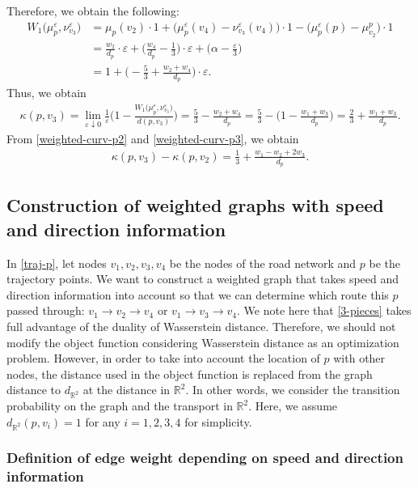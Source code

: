 \documentclass{article}
\numberwithin{equation}{section}
\theoremstyle{definition}
\newcommand{\A}{\alpha}
\newcommand{\K}{\kappa}
\newcommand{\R}{\mathbb{R}}
\newcommand{\eps}{\varepsilon} %
\newcommand{\dto}{\downarrow}
\begin{document}
Therefore, we obtain the following:
\begin{align*}
    W_1\big(\mu_p^\eps,\nu_{v_3}^\eps\big) &= 
     \mu_p(v_2)\cdot1 + \Big(\mu_p^\eps(v_4)-\nu_{v_3}^\eps(v_4)\Big)\cdot1
       -\Big(\mu_p^\eps(p)-\mu_{v_2}^p\Big)\cdot1 \\
    &= \frac{w_2}{d_p}\cdot\eps+\Bigg(\frac{w_4}{d_p}-\frac{1}{3}\Bigg)\cdot\eps 
       + \Bigg( \A-\frac{\eps}{3} \Bigg) \\
    &= 1 + \Bigg( -\frac{5}{3} + \frac{w_2+w_4}{d_p} \Bigg)\cdot\eps.
\end{align*}
Thus, we obtain 
\begin{align}
    \K(p,v_3) = 
     \lim_{\eps\dto0}\frac{1}{\eps}\Bigg(1-\frac{W_1\big(\mu_p^\eps,\nu_{v_3}^\eps\big)}{d(p,v_3)}\Bigg) 
    = \frac{5}{3} - \frac{w_2+w_4}{d_p}
    =\frac{5}{3} - \Bigg( 1-\frac{w_1+w_3}{d_p} \Bigg) %
    = \frac{2}{3} + \frac{w_1+w_3}{d_p}. \label{weighted-curv-p3}
\end{align}
From \eqref{weighted-curv-p2} and \eqref{weighted-curv-p3}, we obtain
\begin{align*}
    \K(p,v_3)-\K(p,v_2) = \frac{1}{3} + \frac{w_1-w_2+2w_3}{d_p}. 
\end{align*}

\subsection*{Construction of weighted graphs with speed and direction information}

In \autoref{traj-p}, let nodes $v_1,v_2,v_3,v_4$ be the nodes of the road network and $p$ be the trajectory points.
We want to construct a weighted graph that takes speed and direction information into account so that we can determine which route this $p$ passed through: $v_1\to v_2\to v_4$ or $v_1\to v_3\to v_4$.
We note here that \autoref{3-pieces} takes full advantage of the duality of Wasserstein distance.
Therefore, we should not modify the object function considering Wasserstein distance as an optimization problem.
However, in order to take into account the location of $p$ with other nodes, the distance used in the object function is replaced from the graph distance to $d_{\R^2}$ at the distance in $\R^2$.
In other words, we consider the transition probability on the graph and the transport in $\R^2$.
Here, we assume $d_{\R^2}(p,v_i)=1$ for any $i=1,2,3,4$ for simplicity.

\subsubsection*{Definition of edge weight depending on speed and direction information}
\end{document}
